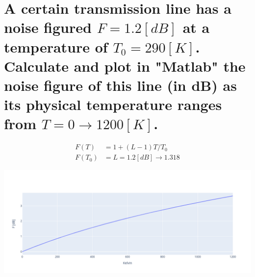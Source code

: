 \documentclass[12pt, letterpaper]{article}
\begin{document}
\section{A certain transmission line has a noise figured $F=1.2[dB]$ at a temperature of $T_0=290[K]$. Calculate and plot in "Matlab" the noise figure of this line (in dB) as
its physical temperature ranges from $T = 0 \rightarrow 1200 [K]$.}

\begin{align}
  F(T)
  &=
  1
  +
  (L-1)T/T_0
  \\
  F(T_0)
  &=
  L
  =
  1.2[dB]
  \rightarrow
  1.318
\end{align}

\includegraphics[width=\columnwidth]{hw5_q6.png}
\end{document}
